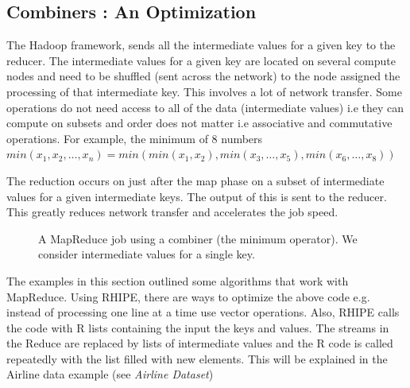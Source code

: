 \documentclass[letterpaper,10pt,english]{sphinxmanual}
\begin{document}
\subsection{Combiners : An Optimization}
\label{introduction:combiners-an-optimization}
The Hadoop framework, sends all the intermediate values for a given key to the
reducer. The intermediate values for a given key are located on several compute
nodes and need to be shuffled (sent across the network) to the node assigned the
processing of that intermediate key. This involves a lot of network
transfer. Some operations do not need access to all of the data (intermediate
values) i.e they can compute on subsets and order does not matter i.e
associative and commutative operations. For example, the minimum of 8 numbers
$min(x_1,x_2,\ldots,x_n) = min( min(x_1,x_2),min(x_3,\ldots,x_5),
min(x_6,\ldots,x_8))$

The reduction occurs on just after the map phase on a subset of intermediate
values for a given intermediate keys. The output of this is sent to the
reducer. This greatly reduces network transfer and accelerates the job speed.
\begin{figure}[htbp]
\centering
\capstart

\caption{A MapReduce job using a combiner (the minimum operator). We consider   intermediate values for a single key.}\end{figure}

The examples in this section outlined some algorithms that work with
MapReduce. Using RHIPE, there are ways to optimize the above code e.g. instead
of processing one line at a time use vector operations. Also, RHIPE calls the
code with R lists containing the input the keys and values. The streams in the
Reduce are replaced by lists of intermediate values and the R code is called
repeatedly with the list filled with new elements. This will be explained in the
Airline data example (see \emph{Airline Dataset})
\end{document}
